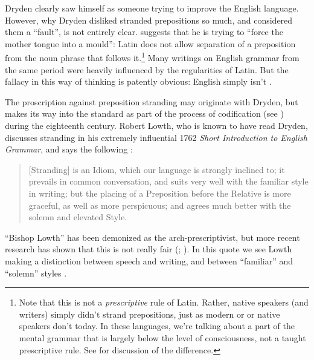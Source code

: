 Dryden clearly saw himself as someone trying to improve the English language. However, why Dryden disliked stranded prepositions so much, and considered them a ``fault'', is not entirely clear. \citet[275]{Bately1964} suggests that he is trying to ``force the mother tongue into a  mould'': Latin does not allow separation of a preposition from the noun phrase that follows it.\footnote{Note that this is not a \textit{prescriptive} rule of Latin. Rather,  native speakers (and writers) simply didn't strand prepositions, just as modern  or  or  native speakers don't today. In these languages, we're talking about a part of the mental grammar that is largely below the level of consciousness, not a taught prescriptive rule. See \citet[75--83]{Freidin2019} for discussion of the difference.} Many writings on English grammar from the same period were heavily influenced by the regularities of Latin. But the fallacy in this way of thinking is patently obvious: English simply isn't .

The proscription against preposition stranding may originate with Dryden, but makes its way into the standard as part of the process of codification (see ) during the eighteenth century. Robert Lowth, who is known to have read Dryden, discusses stranding in his extremely influential 1762 \textit{Short Introduction to English Grammar}, and says the following \citep[127--128]{Lowth1762}:

\begin{quote}
    [Stranding] is an Idiom, which our language is strongly inclined to; it prevails in common conversation, and suits very well with the familiar style in writing; but the placing of a Preposition before the Relative is more graceful, as well as more perspicuous; and agrees much better with the solemn and elevated Style.
\end{quote}

\noindent ``Bishop Lowth'' has been demonized as the arch-prescriptivist, but more recent research has shown that this is not really fair (\citealp[111]{Beal2004}; \citealp{Tieken2010}). In this quote we see Lowth making a distinction between speech and writing, and between ``familiar'' and ``solemn'' styles \citep[214--218]{YanezBouza2015}. 

